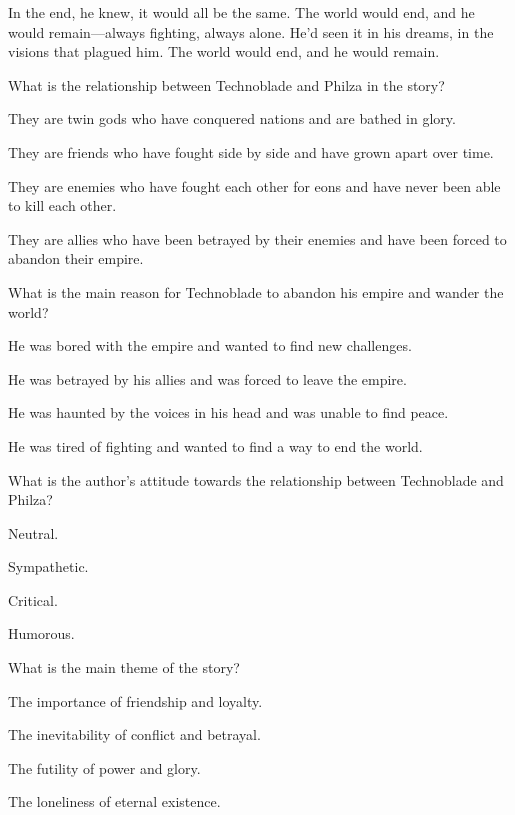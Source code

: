 \documentclass{exam-zh}
\begin{document}
In the end, he knew, it would all be the same. The world would end, and he would remain—always fighting, always alone. He’d seen it in his dreams, in the visions that plagued him. The world would end, and he would remain.

\begin{question}
What is the relationship between Technoblade and Philza in the story?
\begin{choices}
  \item They are twin gods who have conquered nations and are bathed in glory.
  \item They are friends who have fought side by side and have grown apart over time.
  \item They are enemies who have fought each other for eons and have never been able to kill each other.
  \item They are allies who have been betrayed by their enemies and have been forced to abandon their empire.
\end{choices}
\end{question}

\begin{question}
What is the main reason for Technoblade to abandon his empire and wander the world?
\begin{choices}
  \item He was bored with the empire and wanted to find new challenges.
  \item He was betrayed by his allies and was forced to leave the empire.
  \item He was haunted by the voices in his head and was unable to find peace.
  \item He was tired of fighting and wanted to find a way to end the world.
\end{choices}
\end{question}

\begin{question}
What is the author's attitude towards the relationship between Technoblade and Philza?
\begin{choices}
  \item Neutral.
  \item Sympathetic.
  \item Critical.
  \item Humorous.
\end{choices}
\end{question}

\begin{question}
What is the main theme of the story?
\begin{choices}
  \item The importance of friendship and loyalty.
  \item The inevitability of conflict and betrayal.
  \item The futility of power and glory.
  \item The loneliness of eternal existence.
\end{choices}
\end{question}
\end{document}
